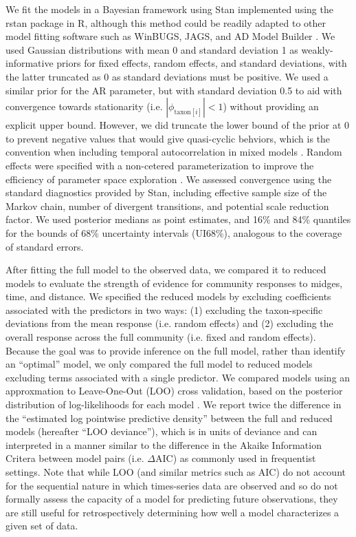 We fit the models in a Bayesian framework using Stan \citep{Carpenter2017}
implemented using the rstan \citep{Stan2018} package in R,
although this method could be readily adapted to other model fitting software
such as WinBUGS, JAGS, and AD Model Builder \citep{Bolker2013}.
We used Gaussian distributions with mean 0 and standard deviation 1 as
weakly-informative priors \citep{Gelman2017}
for fixed effects, random effects, and standard deviations,
with the latter truncated as 0 as standard deviations must be positive.
We used a similar prior for the AR parameter, but with standard deviation 0.5 to aid with
convergence towards stationarity (i.e. $|\phi_{\text{taxon}[i]}|<1$) without
providing an explicit upper bound.
However, we did truncate the lower bound of the prior at 0 to prevent negative
values that would give quasi-cyclic behviors, which is the convention when
including temporal autocorrelation in mixed models \citep{Zuur2009}.
Random effects were specified with a non-cetered parameterization
to improve the efficiency of parameter space exploration \citep{Betancourt2015}.
We assessed convergence using the standard diagnostics provided by Stan,
including effective sample size of the Markov chain, number of divergent
transitions, and potential scale reduction factor.
We used posterior medians as point estimates,
and 16\% and 84\% quantiles
for the bounds of 68\% uncertainty intervals (UI68\%),
analogous to the coverage of standard errors.

After fitting the full model to the observed data, we compared it to reduced models
to evaluate the strength of evidence for community responses to midges, time,
and distance.
We specified the reduced models by excluding coefficients associated with the
predictors in two ways: (1) excluding the taxon-specific deviations from the mean
response (i.e. random effects) and (2) excluding the overall response across the
full community (i.e. fixed and random effects).
Because the goal was to provide inference on the full model, rather than identify
an ``optimal'' model, we only compared the full model to reduced models
excluding terms associated with a single predictor.
We compared models using an approxmation to Leave-One-Out (LOO) cross validation,
based on the posterior distribution of log-likelihoods for each model
\citep{Vehtari2017}.
We report twice the difference in the ``estimated log pointwise predictive density''
between the full and reduced models (hereafter ``LOO deviance''), which is in units of
deviance and can interpreted in a manner similar to the difference in the
Akaike Information Critera between model pairs (i.e. $\Delta$AIC) as
commonly used in frequentist settings.
Note that while LOO (and similar metrics such as AIC) do not account for the
sequential nature in which times-series data are observed and so do not formally
assess the capacity of a model for predicting future observations,
they are still useful for retrospectively determining
how well a model characterizes a given set of data.
